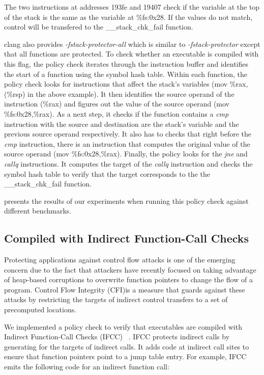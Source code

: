 The two instructions at addresses 193fe and 19407 check if the variable at the top of the stack is 
the same as the variable at \%fs:0x28. If the values do not match, control will be transfered to the \_\_stack\_chk\_fail function.

clang also provides \textit{-fstack-protector-all} which is similar to \textit{-fstack-protector} 
except that all functions are protected. To check whether an executable is compiled with this flag, 
the policy check iterates through the instruction buffer and identifies the start of a function using 
the symbol hash table. Within each function, the policy check looks for instructions that affect the 
stack's variables (mov \%rax,(\%rsp) in the above example). It then identifies the source operand of 
the instruction (\%rax) and figures out the value of the source operand (mov \%fs:0x28,\%rax). As a 
next step, it checks if the function contains a \textit{cmp} instruction with the source and destination 
are the stack's variable and the previous source operand respectively. It also has to checks that right 
before the \textit{cmp} instruction, there is an instruction that computes the original value of the 
source operand (mov \%fs:0x28,\%rax). Finally, the policy looks for the \textit{jne} and \textit{callq} 
instructions. It computes the target of the \textit{callq} instruction and checks the symbol hash table 
to verify that the target corresponds to the the \_\_stack\_chk\_fail function.

 presents the results of our experiments when running this policy 
check against different benchmarks.

\subsection{Compiled with Indirect Function-Call Checks}
Protecting applications against control flow attacks is one of the emerging concern due to the fact 
that attackers have recently focused on taking advantage of heap-based corruptions to overwrite function 
pointers to change the flow of a program. Control Flow Integrity (CFI)is a measure that guards against 
these attacks by restricting the targets of indirect control transfers to a set of precomputed locations.

We implemented a policy check to verify that executables are compiled with Indirect Function-Call Checks 
(IFCC) ~\citep{Edge CFI}. IFCC protects indirect calls by generating for the targets of indirect calls. 
It adds code at indirect call sites to ensure that function pointers point to a jump table entry. For 
example, IFCC emits the following code for an indirect function call:

